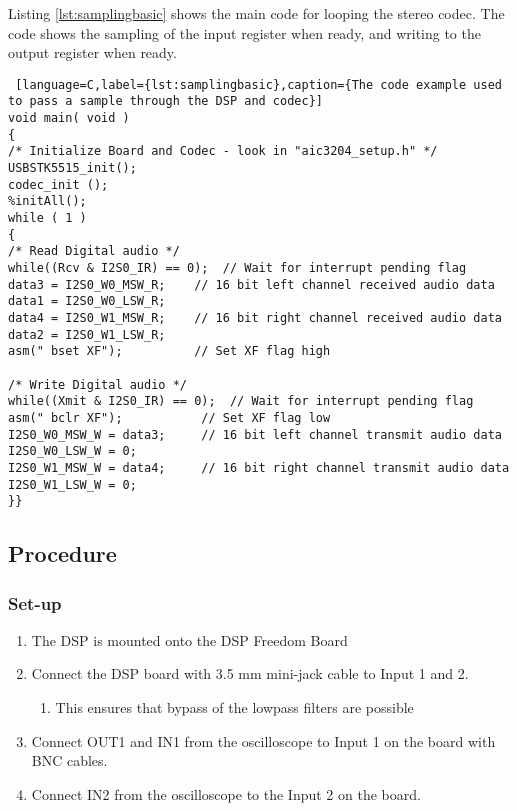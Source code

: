 Listing \ref{lst:samplingbasic} shows the main code for looping the stereo codec. The code shows the sampling of the input register when ready, and writing to the output register when ready. 

\begin{lstlisting} [language=C,label={lst:samplingbasic},caption={The code example used to pass a sample through the DSP and codec}]
void main( void )
{
/* Initialize Board and Codec - look in "aic3204_setup.h" */
USBSTK5515_init();
codec_init ();
%initAll();
while ( 1 )
{
/* Read Digital audio */
while((Rcv & I2S0_IR) == 0);  // Wait for interrupt pending flag
data3 = I2S0_W0_MSW_R;    // 16 bit left channel received audio data
data1 = I2S0_W0_LSW_R;
data4 = I2S0_W1_MSW_R;    // 16 bit right channel received audio data
data2 = I2S0_W1_LSW_R;
asm(" bset XF");	  	  // Set XF flag high

/* Write Digital audio */
while((Xmit & I2S0_IR) == 0);  // Wait for interrupt pending flag
asm(" bclr XF");		   // Set XF flag low
I2S0_W0_MSW_W = data3;     // 16 bit left channel transmit audio data
I2S0_W0_LSW_W = 0;
I2S0_W1_MSW_W = data4;     // 16 bit right channel transmit audio data
I2S0_W1_LSW_W = 0;
}}
\end{lstlisting}



\subsection{Procedure}
\subsubsection{Set-up}
\begin{enumerate}
	\item The DSP is mounted onto the DSP Freedom Board
	\item  Connect the DSP board with 3.5 mm mini-jack cable to Input 1 and 2.
	\begin{enumerate}
		\item This ensures that bypass of the lowpass filters are possible
	\end{enumerate}
	\item Connect OUT1 and IN1 from the oscilloscope to Input 1 on the board with BNC cables.
	\item Connect IN2 from the oscilloscope to the Input 2 on the board.
\end{enumerate}

